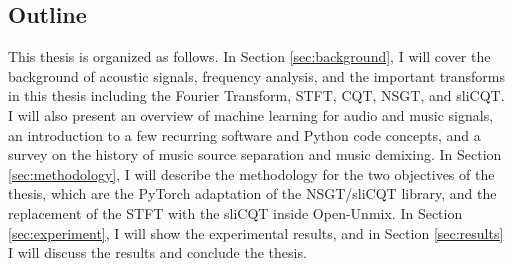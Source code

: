 \documentclass[report.tex]{subfiles}
\begin{document}
\subsection{Outline}

This thesis is organized as follows. In Section \ref{sec:background}, I will cover the background of acoustic signals, frequency analysis, and the important transforms in this thesis including the Fourier Transform, STFT, CQT, NSGT, and sliCQT. I will also present an overview of machine learning for audio and music signals, an introduction to a few recurring software and Python code concepts, and a survey on the history of music source separation and music demixing. In Section \ref{sec:methodology}, I will describe the methodology for the two objectives of the thesis, which are the PyTorch adaptation of the NSGT/sliCQT library, and the replacement of the STFT with the sliCQT inside Open-Unmix. In Section \ref{sec:experiment}, I will show the experimental results, and in Section \ref{sec:results} I will discuss the results and conclude the thesis.
\end{document}

